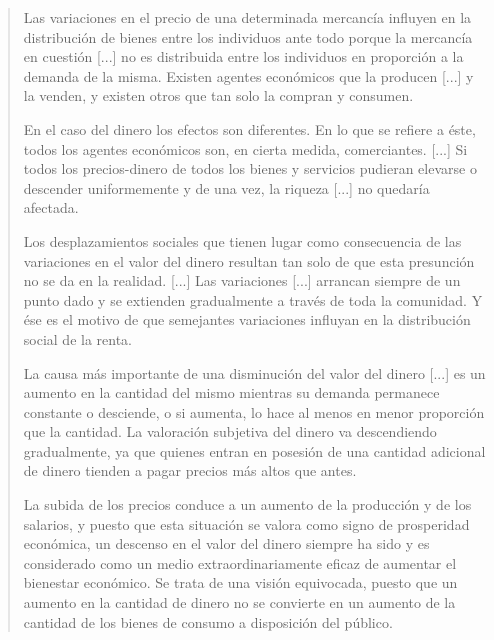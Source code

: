 \documentclass[12pt,a4paper,twoside]{book}
\begin{document}
\begin{quotation}
Las variaciones en el precio de una determinada mercancía influyen en la distribución de bienes entre los individuos ante todo porque la mercancía en cuestión [...] no es distribuida entre los individuos en proporción a la demanda de la misma. Existen agentes económicos que la producen [...] y la venden, y existen otros que tan solo la compran y consumen.

En el caso del dinero los efectos son diferentes. En lo que se refiere a éste, todos los agentes económicos son, en cierta medida, comerciantes. [...] Si todos los precios-dinero de todos los bienes y servicios pudieran elevarse o descender uniformemente y de una vez, la riqueza [...] no quedaría afectada.

Los desplazamientos sociales que tienen lugar como consecuencia de las variaciones en el valor del dinero resultan tan solo de que esta presunción no se da en la realidad. [...] Las variaciones [...] arrancan siempre de un punto dado y se extienden gradualmente a través de toda la comunidad. Y ése es el motivo de que semejantes variaciones influyan en la distribución social de la renta.

La causa más importante de una disminución del valor del dinero [...] es un aumento en la cantidad del mismo mientras su demanda permanece constante o desciende, o si aumenta, lo hace al menos en menor proporción que la cantidad. La valoración subjetiva del dinero va descendiendo gradualmente, ya que quienes entran en posesión de una cantidad adicional de dinero tienden a pagar precios más altos que antes.

La subida de los precios conduce a un aumento de la producción y de los salarios, y puesto que esta situación se valora como signo de prosperidad económica, un descenso en el valor del dinero siempre ha sido y es considerado como un medio extraordinariamente eficaz de aumentar el bienestar económico. Se trata de una visión equivocada, puesto que un aumento en la cantidad de dinero no se convierte en un aumento de la cantidad de los bienes de consumo a disposición del público.


\end{quotation}
\end{document}
